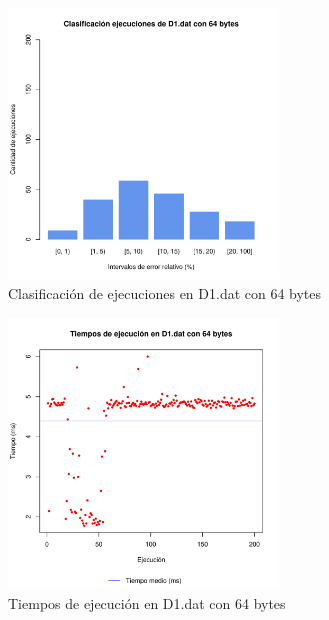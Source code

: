 \begin{figure}[h!]
    \centering
        \includegraphics[width=0.64\textwidth]{../figs/D1/plot_count_64.pdf}
        \caption{Clasificación de ejecuciones en D1.dat con 64 bytes}
    \label{figura:D1_count_64}
\end{figure}

\begin{figure}[h!]
    \centering
        \includegraphics[width=0.64\textwidth]{../figs/D1/plot_time_64.pdf}
        \caption{Tiempos de ejecución en D1.dat con 64 bytes}
    \label{figura:D1_time_64}
\end{figure}

\clearpage
